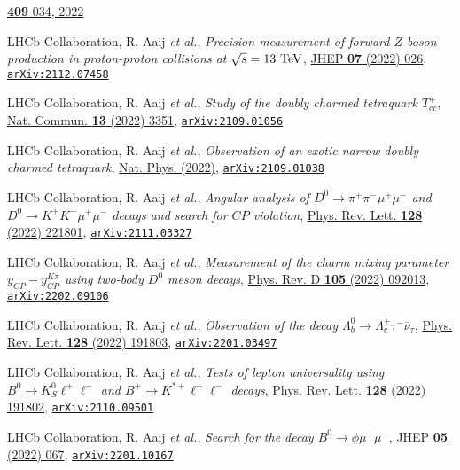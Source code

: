 \documentclass[a4paper, 11pt]{article}
\newenvironment{cvcontent}{
  \leftskip=0.5cm\rightskip=0cm
  \noindent\ignorespaces}{\par}
\newcommand{\arxiv}[1]{\href{https://arxiv.org/abs/#1}{\texttt{arXiv:#1}}}
\begin{document}
\begin{cvcontent}
\begin{enumerate}[label={[\arabic*]}, leftmargin=1.5cm]
    \href{https://doi.org/10.22323/1.409.0034}{\textbf{409} 034, 2022}
    \item LHCb Collaboration, R. Aaij \emph{et al.}, 
    \emph{Precision measurement of forward $Z$ boson production in proton-proton collisions at $\sqrt{s} = 13~\rm{TeV}$},
    \href{https://doi.org/10.1007/JHEP07(2022)026}{JHEP \textbf{07} (2022) 026},
    \arxiv{2112.07458}
    \item LHCb Collaboration, R. Aaij \emph{et al.}, 
    \emph{Study of the doubly charmed tetraquark $T_{cc}^+$},
    \href{https://doi.org/10.1038/s41467-022-30206-w}{Nat. Commun. \textbf{13} (2022) 3351},
    \arxiv{2109.01056}
    \item LHCb Collaboration, R. Aaij \emph{et al.}, 
    \emph{Observation of an exotic narrow doubly charmed tetraquark},
    \href{https://doi.org/10.1038/s41567-022-01614-y}{Nat. Phys. (2022)},
    \arxiv{2109.01038}
    \sloppy
    \item LHCb Collaboration, R. Aaij \emph{et al.}, 
    \emph{Angular analysis of $D^0 \to \pi^+\pi^-\mu^+\mu^-$ and $D^0 \to K^+K^-\mu^+\mu^-$ decays and search for $CP$ violation},
    \href{https://link.aps.org/doi/10.1103/PhysRevLett.128.221801}{Phys. Rev. Lett. \textbf{128} (2022) 221801},
    \arxiv{2111.03327}
    \item LHCb Collaboration, R. Aaij \emph{et al.},
    \emph{Measurement of the charm mixing parameter $y_{CP} - y_{CP}^{K\pi}$ using two-body $D^0$ meson decays},
    \href{https://link.aps.org/doi/10.1103/PhysRevD.105.092013}{Phys. Rev. D \textbf{105} (2022) 092013},
    \arxiv{2202.09106}
    \item LHCb Collaboration, R. Aaij \emph{et al.}, 
    \emph{Observation of the decay $\Lambda_b^0 \rightarrow \Lambda_c^+\tau^-\overline{\nu}_{\tau}$},
    \href{https://link.aps.org/doi/10.1103/PhysRevLett.128.191803}{Phys. Rev. Lett. \textbf{128} (2022) 191803},
    \arxiv{2201.03497}
    \item LHCb Collaboration, R. Aaij \emph{et al.}, 
    \emph{Tests of lepton universality using $B^0\to K^0_S \ell^+ \ell^-$ and $B^+\to K^{*+}\ell^+\ell^-$ decays},
    \href{https://link.aps.org/doi/10.1103/PhysRevLett.128.191802}{Phys. Rev. Lett. \textbf{128} (2022) 191802},
    \arxiv{2110.09501}
    \item LHCb Collaboration, R. Aaij \emph{et al.},
    \emph{Search for the decay $B^0\to\phi\mu^+\mu^-$},
    \href{https://doi.org/10.1007/JHEP05(2022)067}{JHEP \textbf{05} (2022) 067},
    \arxiv{2201.10167}

\end{enumerate}
\end{cvcontent}
\end{document}
